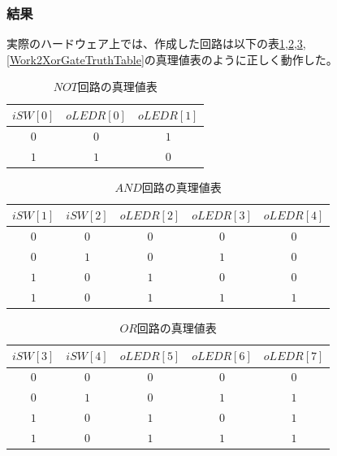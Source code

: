 \documentclass[a4paper]{jarticle}
\begin{document}
\subsubsection{結果}
実際のハードウェア上では、作成した回路は以下の表\ref{Work2NotGateTruthTable},\ref{Work2AndGateTruthTable},\ref{Work2OrGateTruthTable},\ref{Work2XorGateTruthTable}の真理値表のように正しく動作した。
\begin{table}[H]
	\begin{center}
		\caption{$NOT$回路の真理値表}
		\label{Work2NotGateTruthTable}
		\begin{tabular}{|c|c|c|}
			\hline
			$iSW \left[ 0 \right]$	&$oLEDR \left[ 0 \right]$	&$oLEDR \left[ 1 \right]$\\	\hline\hline
			$0$			&$0$				&$1$\\				\hline
			$1$			&$1$				&$0$\\				\hline
		\end{tabular}
	\end{center}
\end{table}
\begin{table}[H]
	\begin{center}
		\caption{$AND$回路の真理値表}
		\label{Work2AndGateTruthTable}
		\begin{tabular}{|c|c|c|c|c|}
			\hline
			$iSW \left[ 1 \right]$	&$iSW \left[ 2 \right]$	&$oLEDR \left[ 2 \right]$	&$oLEDR \left[ 3 \right]$	&$oLEDR \left[ 4 \right]$\\	\hline\hline
			$0$			&$0$			&$0$				&$0$				&$0$\\				\hline
			$0$			&$1$			&$0$				&$1$				&$0$\\				\hline
			$1$			&$0$			&$1$				&$0$				&$0$\\				\hline
			$1$			&$0$			&$1$				&$1$				&$1$\\				\hline
		\end{tabular}
	\end{center}
\end{table}
\begin{table}[H]
	\begin{center}
		\caption{$OR$回路の真理値表}
		\label{Work2OrGateTruthTable}
		\begin{tabular}{|c|c|c|c|c|}
			\hline
			$iSW \left[ 3 \right]$	&$iSW \left[ 4 \right]$	&$oLEDR \left[ 5 \right]$	&$oLEDR \left[ 6 \right]$	&$oLEDR \left[ 7 \right]$\\	\hline\hline
			$0$			&$0$			&$0$				&$0$				&$0$\\				\hline
			$0$			&$1$			&$0$				&$1$				&$1$\\				\hline
			$1$			&$0$			&$1$				&$0$				&$1$\\				\hline
			$1$			&$0$			&$1$				&$1$				&$1$\\				\hline
		\end{tabular}
	\end{center}
\end{table}
\end{document}
